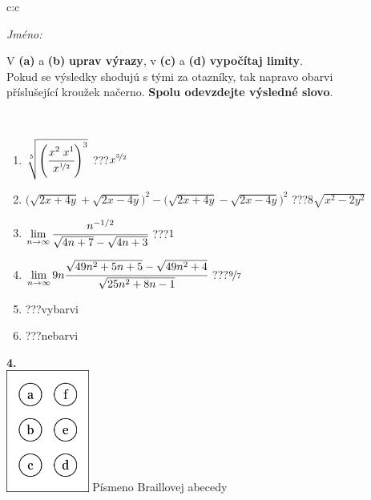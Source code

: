 \documentclass[10pt]{report}
\begin{document}
\begin{tabular}{c:c}
\begin{minipage}[c][104.5mm][t]{0.5\linewidth}
\begin{center}
\textit{Jméno:}\phantom{xxxxxxxxxxxxxxxxxxxxxxxxxxxxxxxxxxxxxxxxxxxxxxxxxxxxxxxxxxxxxxxxx}\\[5mm]
\begin{minipage}{0.95\linewidth}
\begin{center}
V \textbf{(a)} a \textbf{(b)} \textbf{uprav výrazy}, v \textbf{(c)} a \textbf{(d)} \textbf{vypočítaj limity}.\\Pokud se výsledky shodujú s tými za otazníky, tak napravo obarvi\\příslušející kroužek načerno. \textbf{Spolu odevzdejte výsledné slovo}.
\end{center}
\end{minipage}
\\[1mm]
\begin{minipage}{0.79\linewidth}
\begin{center}
\begin{varwidth}{\linewidth}
\begin{enumerate}
\small
\item $\sqrt[5]{\left(\cfrac{x^{2}\;x^{1}}{x^{\nicefrac{1}{2}}}\right)^{3}}$\quad \dotfill\; ???\;\dotfill \quad $x^{\nicefrac{3}{2}}$
\item {\footnotesize{\scriptsize$\big(\sqrt{2x+4y}+\sqrt{2x-4y}\big)^2-\big(\sqrt{2x+4y}-\sqrt{2x-4y}\big)^2$}\quad \dotfill\; ???\;\dotfill \quad $8\sqrt{x^2-2y^2}$}
\item $\lim\limits_{n\to\infty}\cfrac{n^{-1/2}}{\sqrt{4n+7}-\sqrt{4n+3}}$\quad \dotfill\; ???\;\dotfill \quad $1$
\item $\lim\limits_{n\to\infty}9n\cfrac{\sqrt{49n^2+5n+5}-\sqrt{49n^2+4}}{\sqrt{25n^2+8n-1}}$\quad \dotfill\; ???\;\dotfill \quad $\nicefrac{9}{7}$
\item \quad \dotfill\; ???\;\dotfill \quad vybarvi
\item \quad \dotfill\; ???\;\dotfill \quad nebarvi
\end{enumerate}
\end{varwidth}
\end{center}
\end{minipage}
\begin{minipage}{0.20\linewidth}
\begin{center}
{\Huge\bfseries 4.} \\[2mm]
\includegraphics[height=40mm]{../images/braille.png}
{\small Písmeno Braillovej abecedy}
\end{center}
\end{minipage}
\end{center}
\end{minipage}
%
\end{tabular}
\end{document}
